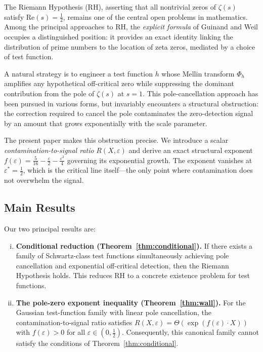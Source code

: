 \documentclass[12pt]{article}
\theoremstyle{remark}
\begin{document}
The Riemann Hypothesis (RH), asserting that all nontrivial zeros of
$\zeta(s)$ satisfy $\mathrm{Re}(s) = \tfrac{1}{2}$, remains one of the
central open problems in mathematics. Among the principal approaches to RH,
the \emph{explicit formula} of Guinand \cite{Guinand1948} and Weil
\cite{Weil1952} occupies a distinguished position: it provides an exact
identity linking the distribution of prime numbers to the location of zeta
zeros, mediated by a choice of test function.

A natural strategy is to engineer a test function $h$ whose Mellin transform
$\Phi_h$ amplifies any hypothetical off-critical zero while suppressing the
dominant contribution from the pole of $\zeta(s)$ at $s=1$. This
pole-cancellation approach has been pursued in various forms, but invariably
encounters a structural obstruction: the correction required to cancel the
pole contaminates the zero-detection signal by an amount that grows
exponentially with the scale parameter.

The present paper makes this obstruction precise. We introduce a scalar
\emph{contamination-to-signal ratio} $R(X,\varepsilon)$ and derive an exact
structural exponent $f(\varepsilon) = \tfrac{5}{16} - \tfrac{\varepsilon}{2}
- \tfrac{\varepsilon^2}{4}$ governing its exponential growth. The exponent
vanishes at $\varepsilon^* = \tfrac{1}{2}$, which is the critical line
itself---the only point where contamination does not overwhelm the signal.

\subsection{Main Results}

Our two principal results are:

\begin{enumerate}[(i)]
\item \textbf{Conditional reduction (Theorem~\ref{thm:conditional}).}
  If there exists a family of Schwartz-class test functions simultaneously
  achieving pole cancellation and exponential off-critical detection, then
  the Riemann Hypothesis holds. This reduces RH to a concrete existence
  problem for test functions.

\item \textbf{The pole-zero exponent inequality (Theorem~\ref{thm:wall}).}
  For the Gaussian test-function family with linear pole cancellation,
  the contamination-to-signal ratio satisfies
  $R(X,\varepsilon) = \Theta(\exp(f(\varepsilon)\cdot X))$ with
  $f(\varepsilon) > 0$ for all $\varepsilon \in (0,\tfrac{1}{2})$.
  Consequently, this canonical family cannot satisfy the conditions of
  Theorem~\ref{thm:conditional}.
\end{enumerate}
\end{document}
